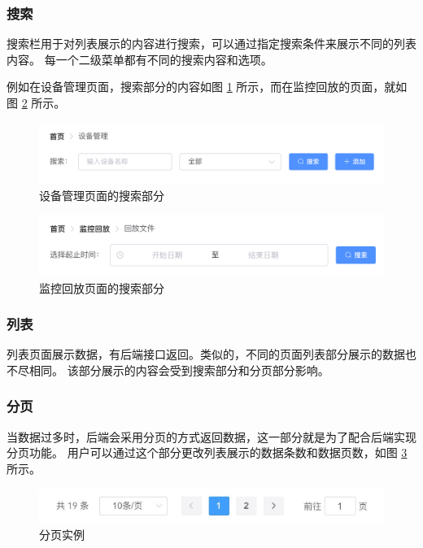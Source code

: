 \subsubsection{搜索}
搜索栏用于对列表展示的内容进行搜索，可以通过指定搜索条件来展示不同的列表内容。
每一个二级菜单都有不同的搜索内容和选项。

例如在设备管理页面，搜索部分的内容如图 \ref{Fig:search_device} 所示，而在监控回放的页面，就如图 
\ref{Fig:search_replay} 所示。

\begin{figure}[ht]
    \centering
    \includegraphics[width=0.9\linewidth]{./Figure/IMG_search_device.png}
    \caption{设备管理页面的搜索部分}\label{Fig:search_device}
\end{figure}

\begin{figure}[ht]
    \centering
    \includegraphics[width=0.9\linewidth]{./Figure/IMG_search_replay.png}
    \caption{监控回放页面的搜索部分}\label{Fig:search_replay}
\end{figure}

\subsubsection{列表}
列表页面展示数据，有后端接口返回。类似的，不同的页面列表部分展示的数据也不尽相同。
该部分展示的内容会受到搜索部分和分页部分影响。

\subsubsection{分页}
当数据过多时，后端会采用分页的方式返回数据，这一部分就是为了配合后端实现分页功能。
用户可以通过这个部分更改列表展示的数据条数和数据页数，如图 \ref{Fig:page} 所示。

\begin{figure}[ht]
    \centering
    \includegraphics[width=0.9\linewidth]{./Figure/IMG_page.png}
    \caption{分页实例}\label{Fig:page}
\end{figure}

